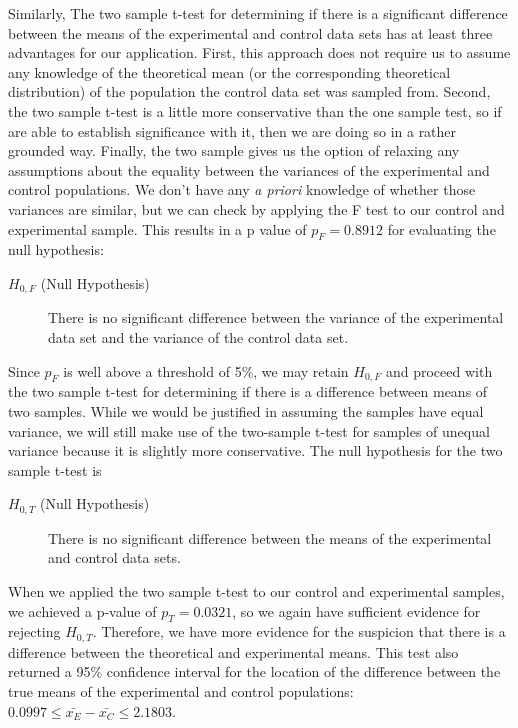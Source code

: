 \documentclass{amsart}
\begin{document}
Similarly, The two sample t-test for determining if there is a significant difference between the means of the experimental and control data sets has at least three advantages for our application. First, this approach does not require us to assume any knowledge of the theoretical mean (or the corresponding theoretical distribution) of the population the control data set was sampled from. Second, the two sample t-test is a little more conservative than the one sample test, so if are able to establish significance with it, then we are doing so in a rather grounded way. Finally, the two sample gives us the option of relaxing any assumptions about the equality between the variances of the  experimental and control populations. We don't have any \textsl{a priori} knowledge of whether those variances are similar, but we can check by applying the F test to our control and experimental sample. This results in a p value of $p_F=0.8912$ for evaluating the null hypothesis:
\begin{description}
\item[$H_{0,F}$ (Null Hypothesis)] There is no significant difference between the variance of the experimental data set and the variance of the control data set.
\end{description}
Since $p_F$ is well above a threshold of 5\%, we may retain $H_{0,F}$ and proceed with the two sample t-test for determining if there is a difference between means of two samples. While we would be justified in assuming the samples have equal variance, we will still make use of the two-sample t-test for samples of unequal variance because it is slightly more conservative. The null hypothesis for the two sample t-test is
\begin{description}
\item[$H_{0,T}$ (Null Hypothesis)] There is no significant difference between the means of the experimental and control data sets.
\end{description}
When we applied the two sample t-test to our control and experimental samples, we achieved a p-value of $p_T=0.0321$, so we again have sufficient evidence for rejecting $H_{0,T}$. Therefore, we have more evidence for the suspicion that there is a difference between the theoretical and experimental means. This test also returned a 95\% confidence interval for the location of the difference between the true means of the experimental and control populations: $0.0997\le \bar{x_E}-\bar{x_C} \le 2.1803$.
\end{document}
